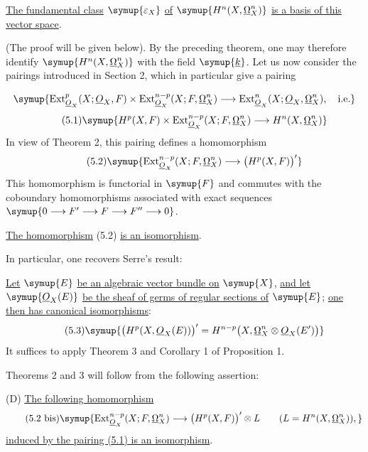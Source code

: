  \uline{The fundamental class} $\symup{\varepsilon_X}$ \uline{of}
$\symup{H^{n}(X,\underline{\Omega}_X^{n})}$ \uline{is a basis of this vector space}.

(The proof will be given below). By the preceding theorem, one may therefore
identify $\symup{H^{n}(X,\underline{\Omega}_X^{n})}$ with the field $\symup{\underline{k}}$. Let us now consider the pairings
introduced in Section 2, which in particular give a pairing

\[
\symup{\operatorname{Ext}_{\Osh_X}^{p}(X;\Osh_X,F)
\times\operatorname{Ext}_{\Osh_X}^{n-p}(X;F,\underline{\Omega}_X^{n})
\longrightarrow
\operatorname{Ext}_{\Osh_X}^{n}(X;\Osh_X,\underline{\Omega}_X^{n}),\quad\text{i.e.}}
\]
\begin{equation}\tag{5.1}
  \symup{H^{p}(X,F)
  \times\operatorname{Ext}_{\Osh_X}^{n-p}(X;F,\underline{\Omega}_X^{n})
  \longrightarrow H^{n}(X,\underline{\Omega}_X^{n})}
\end{equation}
In view of Theorem 2, this pairing defines a homomorphism
\begin{equation}\tag{5.2}
  \symup{\operatorname{Ext}_{\Osh_X}^{n-p}(X;F,\underline{\Omega}_X^{n})
  \longrightarrow\bigl(H^{p}(X,F)\bigr)'}
\end{equation}
This homomorphism is functorial in $\symup{F}$ and commutes with the coboundary
homomorphisms associated with exact sequences
$\symup{0\longrightarrow F'\longrightarrow F
\longrightarrow F''\longrightarrow0}$.

 \uline{The homomorphism} (5.2) \uline{is an isomorphism}.

In particular, one recovers Serre's result:

 \uline{Let} $\symup{E}$ \uline{be an algebraic vector bundle on} $\symup{X}$, \uline{and let}
$\symup{\Osh_X(E)}$ \uline{be the sheaf of germs of regular sections of} $\symup{E}$; \uline{one then has
canonical isomorphisms}:
\begin{equation}\tag{5.3}
  \symup{\bigl(H^{p}(X,\Osh_X(E))\bigr)'
  =H^{n-p}\bigl(X,\underline{\Omega}_X^{n}\otimes\Osh_X(E')\bigr)}
\end{equation}
It suffices to apply Theorem 3 and Corollary 1 of Proposition 1.

Theorems 2 and 3 will follow from the following assertion:

\noindent(D) \uline{The following homomorphism}
\begin{equation}\tag{5.2 bis}
  \symup{\operatorname{Ext}_{\Osh_X}^{n-p}(X;F,\underline{\Omega}_X^{n})
  \longrightarrow\bigl(H^{p}(X,F)\bigr)'\otimes L
  \qquad (L=H^{n}(X,\underline{\Omega}_X^{n})),}
\end{equation}
\uline{induced by the pairing (5.1) is an isomorphism}.

